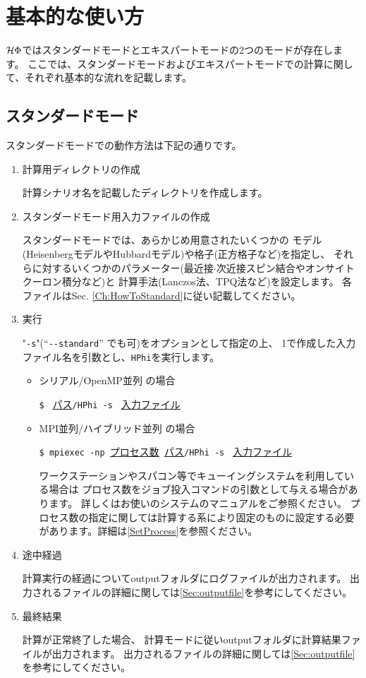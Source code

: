 \newpage
\section{基本的な使い方}
$\mathcal{H} \Phi$ではスタンダードモードとエキスパートモードの2つのモードが存在します。
ここでは、スタンダードモードおよびエキスパートモードでの計算に関して、それぞれ基本的な流れを記載します。

\subsection{スタンダードモード}
スタンダードモードでの動作方法は下記の通りです。

 \begin{enumerate}
   \item  計算用ディレクトリの作成

計算シナリオ名を記載したディレクトリを作成します。

   \item  スタンダードモード用入力ファイルの作成

スタンダードモードでは、あらかじめ用意されたいくつかの
モデル(HeisenbergモデルやHubbardモデル)や格子(正方格子など)を指定し、
それらに対するいくつかのパラメーター(最近接$\cdot$次近接スピン結合やオンサイトクーロン積分など)と
計算手法(Lanczos法、TPQ法など)を設定します。
各ファイルはSec. \ref{Ch:HowToStandard}に従い記載してください。

 \item  実行

"\verb|-s|"(``\verb|--standard|'' でも可)をオプションとして指定の上、
1で作成した入力ファイル名を引数とし、\verb|HPhi|を実行します。

\begin{itemize}
\item シリアル/OpenMP並列 の場合

  \verb|$ | \underline{パス}\verb|/HPhi -s | \underline{入力ファイル} 

\item MPI並列/ハイブリッド並列 の場合

  \verb|$ mpiexec -np |\underline{プロセス数}\verb| |\underline{パス}\verb|/HPhi -s | \underline{入力ファイル} 

  ワークステーションやスパコン等でキューイングシステムを利用している場合は
  プロセス数をジョブ投入コマンドの引数として与える場合があります。
  詳しくはお使いのシステムのマニュアルをご参照ください。
  {プロセス数の指定に関しては計算する系により固定のものに設定する必要があります。詳細は\ref{SetProcess}を参照ください。}

\end{itemize}

\item 途中経過

計算実行の経過についてoutputフォルダにログファイルが出力されます。
出力されるファイルの詳細に関しては\ref{Sec:outputfile}を参考にしてください。

\item 最終結果

計算が正常終了した場合、
計算モードに従いoutputフォルダに計算結果ファイルが出力されます。
出力されるファイルの詳細に関しては\ref{Sec:outputfile}を参考にしてください。
\end{enumerate}

